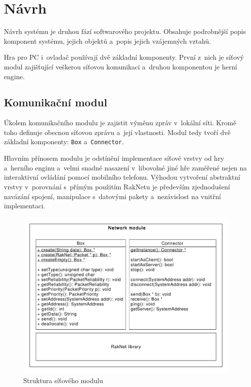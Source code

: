 \documentclass[thesis=B,czech,hidelinks]{FITthesis}[2012/06/26] %
\newcommand{\code}[1]{\texttt{#1}}
\begin{document}
\section{Návrh}

Návrh systému je druhou fází softwarového projektu. Obsahuje podrobnější popis komponent systému, jejich objektů a~popis jejich vzájemných vztahů.

Hra pro PC i~ovladač používají dvě základní komponenty. První z~nich je síťový modul zajišťující veškerou síťovou komunikaci a~druhou komponentou je herní engine. 

\subsection{Komunikační modul}

Úkolem komunikačního modulu je zajistit výměnu zpráv v~lokální síti. Kromě toho definuje obecnou síťovou zprávu a~její vlastnosti. Modul tedy tvoří dvě základní komponenty: \code{Box} a~\code{Connector}. 

Hlavním přínosem modulu je odstínění implementace síťové vrstvy od hry a~herního enginu a~velmi snadné nasazení v~libovolné jiné hře zaměřené nejen na interaktivní ovládání pomocí mobilního telefonu. Výhodou vytvoření abstraktní vrstvy v~porovnání s~přímým použitím RakNetu je především zjednodušení navázání spojení, manipulace s~datovými pakety a~nezávislost na vnitřní implementaci.

\begin{figure}[h]
\includegraphics[width=\textwidth]{box_connector}
\caption{Struktura síťového modulu}
\end{figure}
\end{document}
